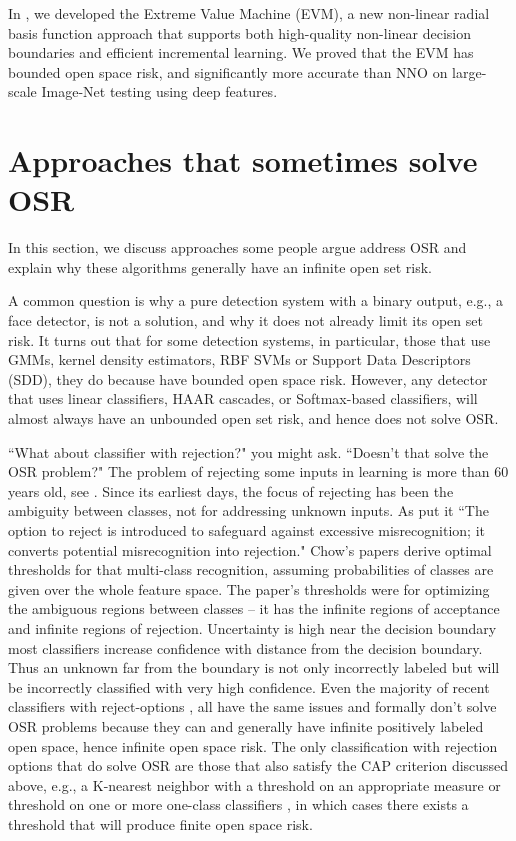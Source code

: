 \documentclass[letterpaper]{article}
\begin{document}
In \cite{rudd2018extreme}, we developed the Extreme Value Machine (EVM), a new non-linear radial basis function approach that supports both high-quality non-linear decision boundaries and efficient incremental learning. We proved that the EVM has bounded open space risk, and significantly more accurate than NNO on large-scale Image-Net testing using deep features. 



\section{Approaches that sometimes solve OSR}

In this section, we discuss approaches some people argue address OSR and explain why these algorithms generally have an infinite open set risk. 

A common question is why a pure detection system with a binary output, e.g., a face detector, is not a solution, and why it does not already limit its open set risk.
It turns out that for some detection systems, in particular, those
that use GMMs, kernel density estimators, RBF SVMs or Support Data
Descriptors (SDD), they do because have bounded open space risk.
However, any detector that uses linear classifiers, HAAR cascades, or
Softmax-based classifiers, will almost always have an unbounded open set risk, and hence
does not solve OSR.



``What about classifier with rejection?"
you might ask.
``Doesn't that solve the OSR problem?"
The problem of rejecting some inputs in learning is more than 60 years old, see \cite{chow1957optimum}.
Since its earliest days,  the focus of rejecting has been the ambiguity between classes, not for addressing unknown inputs.
As \cite{chow1970optimum} put it ``The option to reject is introduced to safeguard against excessive misrecognition; it converts potential misrecognition into rejection."
Chow's papers derive optimal thresholds for that multi-class recognition, assuming probabilities of classes are given over the whole feature space.
The paper's thresholds were for optimizing the ambiguous regions between classes -- it has the infinite regions of acceptance and infinite regions of rejection.
Uncertainty is high near the decision boundary most classifiers increase confidence with distance from the decision boundary.  Thus an unknown far from the boundary is not only incorrectly labeled but will be incorrectly classified with very high confidence.
Even the majority of recent classifiers with reject-options \cite{fumera2002support,zhang2006ro,Grandvalet_nips08_reject,bartlett2008classification,wegkamp-11}, all have the same issues and formally don't solve OSR problems because they can and generally have infinite positively labeled open space, hence infinite open space risk.
The only classification with rejection options that do solve OSR are those that also satisfy the CAP criterion discussed above, e.g., a K-nearest neighbor with a threshold on an appropriate measure \cite{li2005open} or threshold on one or more one-class classifiers \cite{tax2008growing,liu_modular_2016}, in which cases there exists a threshold that will produce finite open space risk.
\end{document}
